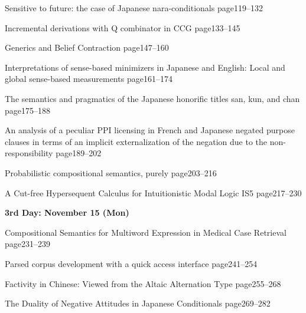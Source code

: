 \documentclass[12pt]{jarticle}
\begin{document}
  
     {Sensitive to future: the case of Japanese nara-conditionals}
     {page119--132}
  
     {Incremental derivations with Q combinator in CCG}
     {page133--145}
  
     {Generics and Belief Contraction}
     {page147--160}




  
     {Interpretations of sense-based minimizers in Japanese and English: Local and global sense-based measurements}
     {page161--174}
  
     {The semantics and pragmatics of the Japanese honorific titles san, kun, and chan}
     {page175--188}
  
     {An analysis of a peculiar PPI licensing in French and Japanese negated purpose clauses in terms of an implicit externalization of the negation due to the non-responsibility}
     {page189--202}




  
     {Probabilistic compositional semantics, purely}
     {page203--216}
  
  
     {A Cut-free Hypersequent Calculus for Intuitionistic Modal Logic IS5}
     {page217--230}




\noindent\textbf{\large 
3rd Day: November 15 (Mon)
}\\




  
     {Compositional Semantics for Multiword Expression in Medical Case Retrieval}
     {page231--239}
  
     {Parsed corpus development with a quick access interface}
     {page241--254}
  
     {Factivity in Chinese: Viewed from the Altaic Alternation Type}
     {page255--268}

  


  
     {The Duality of Negative Attitudes in Japanese Conditionals}
     {page269--282}
  
\end{document}
